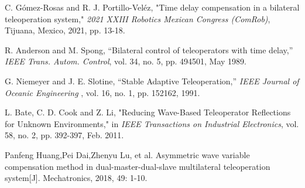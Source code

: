 \begin{thebibliography}{00}
     C. Gómez-Rosas and R. J. Portillo-Veléz, "Time delay compensation in a bilateral teleoperation system," \textit{2021 XXIII Robotics Mexican Congress (ComRob)}, Tijuana, Mexico, 2021, pp. 13-18.

     R. Anderson and M. Spong, “Bilateral control of teleoperators with time delay,” \textit{IEEE Trans. Autom. Control}, vol. 34, no. 5, pp. 494501, May 1989.

     G. Niemeyer and J. E. Slotine, “Stable Adaptive Teleoperation,” \textit{IEEE Journal of Oceanic Engineering} , vol. 16, no. 1, pp. 152162, 1991.

     L. Bate, C. D. Cook and Z. Li, "Reducing Wave-Based Teleoperator Reflections for Unknown Environments," in \textit{IEEE Transactions on Industrial Electronics}, vol. 58, no. 2, pp. 392-397, Feb. 2011.

     Panfeng Huang,Pei Dai,Zhenyu Lu, et al. Asymmetric wave variable compensation method in dual-master-dual-slave multilateral teleoperation system[J]. Mechatronics, 2018, 49: 1-10.
\end{thebibliography}




